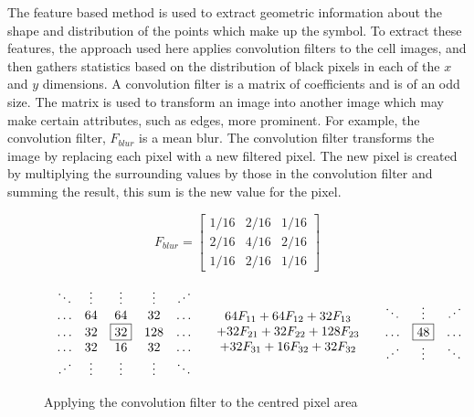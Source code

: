 
The feature based method is used to extract geometric information about the
shape and distribution of the points which make up the symbol. To extract these
features, the approach used here applies convolution filters to the cell images,
and then gathers statistics based on the distribution of black pixels in each
of the $x$ and $y$ dimensions. A convolution filter is a matrix of coefficients
and is of an odd size. The matrix is used to transform an image into another
image which may make certain attributes, such as edges, more prominent.  For
example, the convolution filter, $F_{blur}$ is a mean blur. The convolution
filter transforms the image by replacing each pixel with a new filtered pixel.
The new pixel is created by multiplying the surrounding values by those in the
convolution filter and summing the result, this sum is the new value for the
pixel.

\[ F_{blur} = \left[
\begin{array}{ccc}
1/16 & 2/16 & 1/16 \\
2/16 & 4/16 & 2/16 \\
1/16 & 2/16 & 1/16
\end{array}\right] \]

\begin{figure}[h] \[
\begin{array}{lcr}
\begin{array}{ccccc}
\ddots & \vdots & \vdots & \vdots & \iddots \\
\ldots & 64 & 64 & 32 & \ldots \\
\ldots & 32 & \fbox{32} & 128 & \ldots \\
\ldots & 32 & 16 & 32 & \ldots \\
\iddots & \vdots & \vdots & \vdots & \ddots \\
\end{array} &
\begin{array}{c}
64F_{11} + 64F_{12} + 32F_{13} \\
+ 32F_{21} + 32F_{22} + 128F_{23} \\
+ 32F_{31} + 16F_{32} + 32F_{32} \\
\end{array} &
\begin{array}{ccccc}
\ddots & \vdots & \iddots \\
\ldots &  \fbox{48}  & \ldots \\
\iddots & \vdots & \ddots \\
\end{array}
\end{array} \]
\caption{Applying the convolution filter to the centred pixel area}
\label{figure:convolution}
\end{figure}

